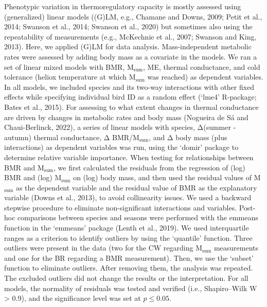 \documentclass[10pt, twoside]{book} %
\begin{document}
Phenotypic variation in thermoregulatory capacity is mostly assessed using (generalized) linear models ((G)LM, e.g., Chamane and Downs, 2009; Petit et al., 2014; Swanson et al., 2014; Swanson et al., 2020) but sometimes also using the repeatability of measurements (e.g., McKechnie et al., 2007; Swanson and King, 2013). Here, we applied (G)LM for data analysis. Mass-independent metabolic rates were assessed by adding body mass as a covariate in the models. We ran a set of linear mixed models with BMR, M$_{\text{sum}}$, ME, thermal conductance, and cold tolerance (heliox temperature at which M$_{\text{sum}}$ was reached) as dependent variables. In all models, we included species and its two-way interactions with other fixed effects while specifying individual bird ID as a random effect (‘lme4’ R-package; Bates et al., 2015). For assessing to what extent changes in thermal conductance are driven by changes in metabolic rates and body mass (Nogueira de Sá and Chaui-Berlinck, 2022), a series of linear models with species, Δ(summer - autumn) thermal conductance, Δ BMR/M$_{\text{sum}}$, and Δ body mass (plus interactions) as dependent variables was run, using the ‘domir’ package to determine relative variable importance. When testing for relationships between BMR and M$_{\text{sum}}$, we first calculated the residuals from the regression of (log) BMR and (log) M$_{\text{sum}}$ on (log) body mass, and then used the residual values of M$_{\text{sum}}$ as the dependent variable and the residual value of BMR as the explanatory variable (Downs et al., 2013), to avoid collinearity issues. We used a backward stepwise procedure to eliminate non-significant interactions and variables. Post-hoc comparisons between species and seasons were performed with the emmeans function in the ‘emmeans’ package (Lenth et al., 2019). We used interquartile ranges as a criterion to identify outliers by using the ‘quantile’ function. Three outliers were present in the data (two for the CW regarding M$_{\text{sum}}$ measurements and one for the BR regarding a BMR measurement). Then, we use the ‘subset’ function to eliminate outliers. After removing them, the analysis was repeated. The excluded outliers did not change the results or the interpretation. For all models, the normality of residuals was tested and verified (i.e., Shapiro–Wilk W > 0.9), and the significance level was set at $p \leq 0.05$.\\
\end{document}

